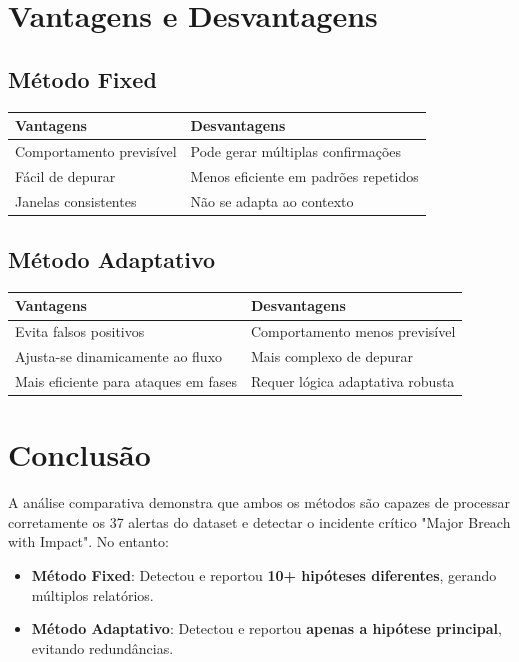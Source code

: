 \documentclass[10pt,a4paper]{article}
\begin{document}
\section{Vantagens e Desvantagens}

\subsection{Método Fixed}

\begin{tabular}{@{}p{}p{}@{}}
\toprule
\textbf{Vantagens} & \textbf{Desvantagens} \\
\midrule
Comportamento previsível & Pode gerar múltiplas confirmações \\
Fácil de depurar & Menos eficiente em padrões repetidos \\
Janelas consistentes & Não se adapta ao contexto \\
\bottomrule
\end{tabular}

\subsection{Método Adaptativo}

\begin{tabular}{@{}p{}p{}@{}}
\toprule
\textbf{Vantagens} & \textbf{Desvantagens} \\
\midrule
Evita falsos positivos & Comportamento menos previsível \\
Ajusta-se dinamicamente ao fluxo & Mais complexo de depurar \\
Mais eficiente para ataques em fases & Requer lógica adaptativa robusta \\
\bottomrule
\end{tabular}

\section{Conclusão}

A análise comparativa demonstra que ambos os métodos são capazes de processar corretamente os 37 alertas do dataset e detectar o incidente crítico "Major Breach with Impact". No entanto:

\begin{itemize}
\item \textbf{Método Fixed}: Detectou e reportou \textbf{10+ hipóteses diferentes}, gerando múltiplos relatórios.
\item \textbf{Método Adaptativo}: Detectou e reportou \textbf{apenas a hipótese principal}, evitando redundâncias.
\end{itemize}
\end{document}
